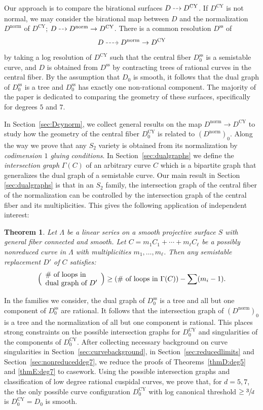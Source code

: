 \documentclass[JEP,XML,SOM,Unicode,NoFloatCountersInSection,published]{cedram}
\newcommand{\dradpl}{{\hspace*{-2mm}\begin{tikzcd}[ampersand replacement=\&,column sep = scriptsize]\mbox{}\ar[r,dashed]\&\mbox{}\end{tikzcd}\hspace*{-2mm}}}
\newcommand{\dratst}{{\hspace*{-2mm}\begin{tikzcd}[ampersand replacement=\&,column sep = small]\mbox{}\ar[r,dashed]\&\mbox{}\end{tikzcd}\hspace*{-2mm}}}
\let\drascst\dratst
\newcommand{\dra}{\mathchoice{\dradpl}{\dratst}{\drascst}{\drascst}}
\theoremstyle{plain}
\newtheorem{Theorem}{Theorem}
\theoremstyle{definition}
\newcommand\Dcy{{D^{\mathrm{CY}}}}
\newcommand\Dss{{D^{\mathrm{ss}}}}
\newcommand\Dsso{{D^{\mathrm{ss}}_0}}
\newcommand\Dcyo{{D^{\mathrm{CY}}_0}}
\newcommand\Dnorm{{D^{\mathrm{norm}}}}
\newcommand\Dnormo{{(\Dnorm)_0}}
\begin{document}
Our approach is to compare the birational surfaces $D \dra \Dcy$. If $\Dcy$ is not normal, we may consider the birational map between $D$ and the normalization $\Dnorm$ of $\Dcy$; $D \dra \Dnorm \to \Dcy$. There is a common resolution $\Dss$ of
\[
D \dra \Dnorm \to \Dcy
\]
by taking a log resolution of $\Dcy$ such that the central fiber $\Dsso$ is a semistable curve, and $D$ is obtained from $\Dss$ by contracting trees of rational curves in the central fiber. By the assumption that $D_0$ is smooth, it follows that the dual graph of $\Dsso$ is a tree and $\Dsso$ has exactly one non-rational component. The majority of the paper is dedicated to comparing the geometry of these surfaces, specifically for degrees $5$ and $7$.

In Section~\ref{sec:Dcynorm}, we collect general results on the map $\Dnorm \to \Dcy$ to study how the geometry of the central fiber $\Dcyo$ is related to $\Dnormo$. Along the way we prove that any $S_2$ variety is obtained from its normalization by \textit{codimension $1$ gluing conditions}. In Section~\ref{sec:dualgraphs} we define the \textit{intersection graph} $\Gamma(C)$ of an arbitrary curve $C$ which is a bipartite graph that generalizes the dual graph of a semistable curve. Our main result in Section \ref{sec:dualgraphs} is that in an $S_2$ family, the intersection graph of the central fiber of the normalization can be controlled by the intersection graph of the central fiber and its multiplicities. This gives the following application of independent interest:

\begin{Theorem}\label{thmF:intgraphs}
Let $\Lambda$ be a linear series on a smooth projective surface $S$ with general fiber connected and smooth. Let $C=m_1C_1+\cdots+m_\ell C_\ell$ be a possibly nonreduced curve in $\Lambda$ with multiplicities $m_1,\dots,m_\ell$. Then any semistable replacement $D'$ of $C$ satisfies:
\[
\Bigl(\begin{array}{l}\text{\# of loops in}\\\text{dual graph of }D'\end{array}\Bigr) \ge \left(\text{\# of loops in }\Gamma(C)\right)-\sum (m_i-1).
\]
\end{Theorem}

In the families we consider, the dual graph of $\Dsso$ is a tree and all but one component of $\Dsso$ are rational. It follows that the intersection graph of $\Dnormo$ is a tree and the normalization of all but one component is rational. This places strong constraints on the possible intersection graphs for $\Dcyo$ and singularities of the components of $\Dcyo$. After collecting necessary background on curve singularities in Section~\ref{sec:curvebackground}, in Section~\ref{sec:reducedlimits} and Section~\ref{sec:nonreduceddeg7}, we reduce the proofs of Theorems~\ref{thmD:deg5} and \ref{thmE:deg7} to casework. Using the possible intersection graphs and classification of low degree rational cuspidal curves, we prove that, for $d = 5, 7$, the the only possible curve configuration $\Dcyo$ with log canonical threshold $\ge \sfrac{3}{d}$ is $\Dcyo = D_0$ is smooth.
\end{document}
